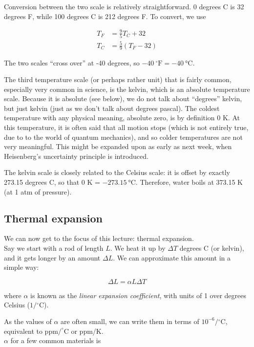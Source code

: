 Conversion between the two scale is relatively straightforward. 0 degrees C is 32 degrees F, while 100 degrees C is 212 degrees F. To convert, we use

\begin{align}
T_F &= \frac{9}{5} T_C + 32\\
T_C &= \frac{5}{9} \left(T_F - 32\right)
\end{align}

The two scales ``cross over'' at -40 degrees, so $\SI{-40}{{}^\circ\text{F}} = \SI{-40}{\degreeCelsius}$.

The third temperature scale (or perhaps rather unit) that is fairly common, especially very common in science, is the kelvin, which is an absolute temperature scale. Because it is absolute (see below), we do not talk about ``degrees'' kelvin, but just kelvin (just as we don't talk about degrees pascal).
The coldest temperature with any physical meaning, absolute zero, is by definition 0 K. At this temperature, it is often said that all motion stops (which is not entirely true, due to to the world of quantum mechanics), and so colder temperatures are not very meaningful. This might be expanded upon as early as next week, when Heisenberg's uncertainty principle is introduced.

The kelvin scale is closely related to the Celsius scale: it is offset by exactly 273.15 degrees C, so that 0 K = $\SI{-273.15}{\degreeCelsius}$. Therefore, water boils at 373.15 K (at 1 atm of pressure).

\subsection{Thermal expansion}

We can now get to the focus of this lecture: thermal expansion.\\
Say we start with a rod of length $L$. We heat it up by $\Delta T$ degrees C (or kelvin), and it gets longer by an amount $\Delta L$. We can approximate this amount in a simple way:

\begin{equation}
\Delta L = \alpha L \Delta T
\end{equation}

where $\alpha$ is known as the \emph{linear expansion coefficient}, with units of 1 over degrees Celsius ($1/{}^\circ$C).

As the values of $\alpha$ are often small, we can write them in terms of $10^{-6}/{}^\circ$C, equivalent to $\text{ppm/}^\circ$C or ppm/K.\\
$\alpha$ for a few common materials is

